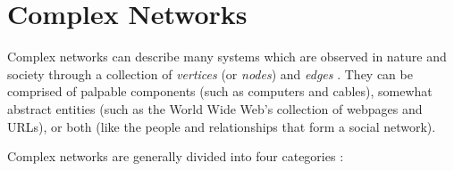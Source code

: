 \chapter{Complex Networks}
\label{chap:complexnetworks}


%


Complex networks can describe many systems which are observed in nature and society through a collection of \textit{vertices} (or \textit{nodes}) and \textit{edges} \citep{newmannetworks}.
They can be comprised of palpable components (such as computers and cables), somewhat abstract entities (such as the World Wide Web's collection of webpages and URLs), or both (like the people and relationships that form a social network).

Complex networks are generally divided into four categories \citep{newmannetworks}:

